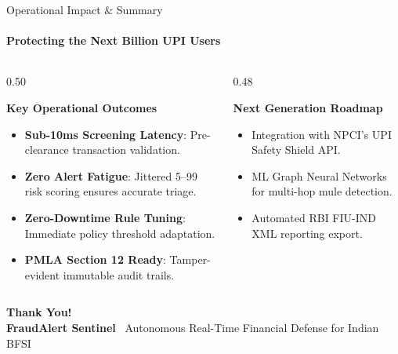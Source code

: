 \documentclass[aspectratio=169,10pt]{beamer}
\begin{document}
\begin{frame}{Operational Impact \& Summary}
  \framesubtitle{Protecting the Next Billion UPI Users}
  \begin{columns}[t]
    \begin{column}{0.50\textwidth}
      \begin{block}{\textbf{Key Operational Outcomes}}
        \begin{itemize}
          \item \textbf{Sub-10ms Screening Latency}: Pre-clearance transaction validation.
          \item \textbf{Zero Alert Fatigue}: Jittered 5--99 risk scoring ensures accurate triage.
          \item \textbf{Zero-Downtime Rule Tuning}: Immediate policy threshold adaptation.
          \item \textbf{PMLA Section 12 Ready}: Tamper-evident immutable audit trails.
        \end{itemize}
      \end{block}
    \end{column}

    \begin{column}{0.48\textwidth}
      \begin{exampleblock}{\textbf{Next Generation Roadmap}}
        \begin{itemize}
          \item Integration with NPCI's UPI Safety Shield API.
          \item ML Graph Neural Networks for multi-hop mule detection.
          \item Automated RBI FIU-IND XML reporting export.
        \end{itemize}
      \end{exampleblock}
    \end{column}
  \end{columns}

  \vspace{1.0em}
  \begin{center}
    {\large \textbf{\textcolor{primaryBlue}{Thank You!}}}\\[0.2em]
    \footnotesize \textbf{FraudAlert Sentinel} \textbar\ Autonomous Real-Time Financial Defense for Indian BFSI
  \end{center}
\end{frame}
\end{document}
